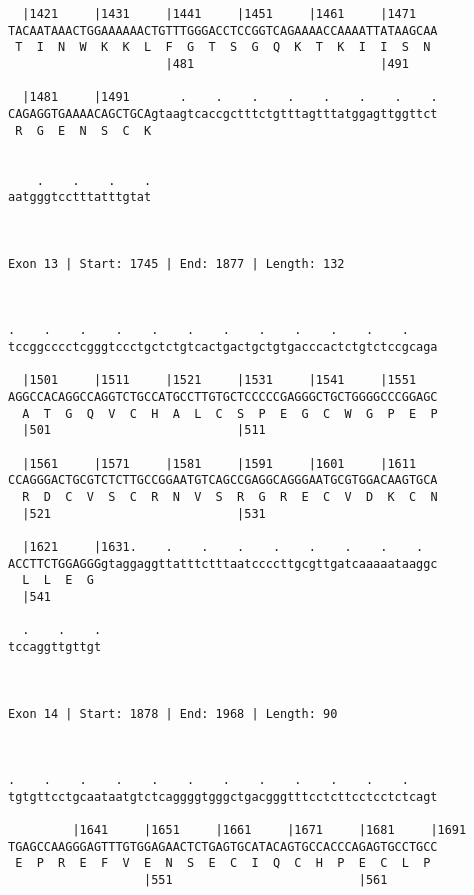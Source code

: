\documentclass{article}
\begin{document}
{\begin{Verbatim}
  |1421     |1431     |1441     |1451     |1461     |1471   
TACAATAAACTGGAAAAAACTGTTTGGGACCTCCGGTCAGAAAACCAAAATTATAAGCAA
 T  I  N  W  K  K  L  F  G  T  S  G  Q  K  T  K  I  I  S  N 
                      |481                          |491    
  
  |1481     |1491       .    .    .    .    .    .    .    .
CAGAGGTGAAAACAGCTGCAgtaagtcaccgctttctgtttagtttatggagttggttct
 R  G  E  N  S  C  K                                        
                                                            
  
    .    .    .    .
aatgggtcctttatttgtat
                    
                    
 
Exon 13 | Start: 1745 | End: 1877 | Length: 132



.    .    .    .    .    .    .    .    .    .    .    .    
tccggcccctcgggtccctgctctgtcactgactgctgtgacccactctgtctccgcaga
                                                            
  |1501     |1511     |1521     |1531     |1541     |1551   
AGGCCACAGGCCAGGTCTGCCATGCCTTGTGCTCCCCCGAGGGCTGCTGGGGCCCGGAGC
  A  T  G  Q  V  C  H  A  L  C  S  P  E  G  C  W  G  P  E  P
  |501                          |511                        
  
  |1561     |1571     |1581     |1591     |1601     |1611   
CCAGGGACTGCGTCTCTTGCCGGAATGTCAGCCGAGGCAGGGAATGCGTGGACAAGTGCA
  R  D  C  V  S  C  R  N  V  S  R  G  R  E  C  V  D  K  C  N
  |521                          |531                        
  
  |1621     |1631.    .    .    .    .    .    .    .    .  
ACCTTCTGGAGGGgtaggaggttatttctttaatccccttgcgttgatcaaaaataaggc
  L  L  E  G                                                
  |541                                                      
  
  .    .    .
tccaggttgttgt
             
             
 
Exon 14 | Start: 1878 | End: 1968 | Length: 90



.    .    .    .    .    .    .    .    .    .    .    .    
tgtgttcctgcaataatgtctcaggggtgggctgacgggtttcctcttcctcctctcagt
                                                            
         |1641     |1651     |1661     |1671     |1681     |1691
TGAGCCAAGGGAGTTTGTGGAGAACTCTGAGTGCATACAGTGCCACCCAGAGTGCCTGCC
 E  P  R  E  F  V  E  N  S  E  C  I  Q  C  H  P  E  C  L  P 
                   |551                          |561       
  

\end{Verbatim}}
\end{document}
